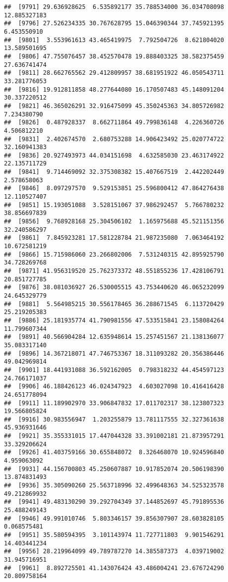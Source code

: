 \documentclass[
]{article}
\begin{document}
\begin{verbatim}
##  [9791] 29.636928625  6.535892177 35.788534000 36.034708098 12.885327183
##  [9796] 27.526234335 30.767628795 15.046390344 37.745921395  6.453550910
##  [9801]  3.553961613 43.465419975  7.792504726  8.621804020 13.589501695
##  [9806] 47.755076457 38.452570478 19.888403325 38.582375459 27.636741474
##  [9811] 28.662765562 29.412809957 38.681951922 46.050543711 33.281776053
##  [9816] 19.912811858 48.277644080 16.170507483 45.148091204 30.337220512
##  [9821] 46.365026291 32.916475099 45.350245363 34.805726982  7.234380790
##  [9826]  0.487928337  8.662711864 49.799836148  4.226360726  4.506812210
##  [9831]  2.402674570  2.680753288 14.906423492 25.020774722 32.160941383
##  [9836] 20.927493973 44.034151698  4.632585030 23.463174922 22.135711729
##  [9841]  9.714469092 32.375308382 15.407667519  2.442202449  2.578658063
##  [9846]  8.097297570  9.529153851 25.596800412 47.864276438 12.110527407
##  [9851] 15.193051088  3.528151067 37.986292457  5.766780232 38.856697839
##  [9856]  9.768928168 25.304506102  1.165975688 45.521151356 32.240586297
##  [9861]  7.845923281 17.581228784 21.987235080  7.063464192 10.672581219
##  [9866] 15.715986060 23.266802006  7.531240315 42.895925790 34.728269768
##  [9871] 41.956319520 25.762373372 48.551855236 17.428106791 20.851727785
##  [9876] 38.081036927 26.530005515 43.753440620 46.065232099 24.645329779
##  [9881]  5.564985215 30.556178465 36.288671545  6.113720429 25.219205383
##  [9886] 25.181935774 41.790981556 47.533515841 23.158084264 11.799607344
##  [9891] 40.566904284 12.635948614 15.257451567 21.138136077 35.083317140
##  [9896] 14.367218071 47.746753367 18.311093282 20.356386446 49.042969814
##  [9901] 18.441931088 36.592162005  0.798318232 44.454597123 24.766171037
##  [9906] 46.188426123 46.024347923  4.603027098 10.416416428 24.651778094
##  [9911] 11.189902970 33.906847832 17.011702317 38.123807323 19.566805824
##  [9916] 30.983556947  1.203255879 13.781117555 32.327361638 45.936931646
##  [9921] 35.355331015 17.447044328 33.391002181 21.873957291 33.329206624
##  [9926] 41.403759166 30.655848072  8.326468070 10.924596840  4.959063092
##  [9931] 44.156700803 45.250607887 10.917852074 20.506198390 13.874831493
##  [9936] 35.305090260 25.563718996 32.499648363 34.525323578 49.212869932
##  [9941] 49.483130290 39.292704349 37.144852697 45.791895536 25.488249143
##  [9946] 49.991010746  5.803346157 39.856307907 28.603828105  0.068575481
##  [9951] 35.580594395  3.101143974 11.727711803  9.901546291 14.403441234
##  [9956] 28.219964099 49.789787270 14.385587373  4.039719002 31.945716951
##  [9961]  8.892725501 41.143076424 43.486004241 23.676724290 20.809758164

\end{verbatim}
\end{document}
